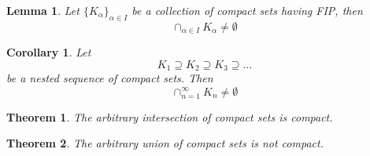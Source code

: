 \documentclass[12pt,reqno]{amsart}
\theoremstyle{plain}
\newtheorem*{theorem}{Theorem}
\newtheorem*{corollary}{Corollary}
\newtheorem*{lemma}{Lemma}
\begin{document}
    \begin{lemma}
        Let ${\{ K_\alpha\}}_{\alpha \in I}$ be a collection of compact sets having FIP, then 
        \[ \cap_{\alpha \in I} K_\alpha \neq \emptyset\]
    \end{lemma}

    \begin{corollary}
        Let 
        \[ K_1 \supseteq K_2 \supseteq K_3 \supseteq \dots \]
        be a nested sequence of compact sets. Then
        \[ \cap_{n = 1}^\infty K_n \neq \emptyset\]
    \end{corollary}

    \begin{theorem}
        The arbitrary intersection of compact sets is compact.
    \end{theorem}

    \begin{theorem}
        The arbitrary union of compact sets is not compact.
    \end{theorem}
\end{document}
